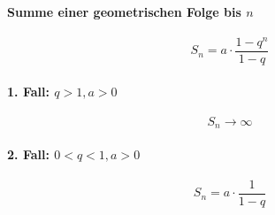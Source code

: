 \begin{gesetz}
    \paragraph{Summe einer geometrischen Folge bis \(n\)}
    \[
        S_n = a \cdot \frac{1 - q^n}{1 - q}
    \]
\end{gesetz}

\paragraph{1. Fall: \(q > 1, a > 0\)}

\[
    S_n \rightarrow \infty    
\]

\paragraph{2. Fall: \(0 < q < 1, a > 0\)}

\[
    S_n = a \cdot \frac{1}{1-q} 
\]
